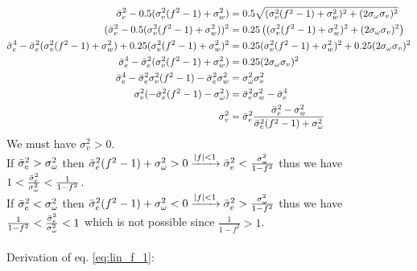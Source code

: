 \documentclass[oneside,12pt]{article}
\newcommand{\abs}[1]{\left| #1\right| }                   %
\begin{document}
\begin{equation*}
    \begin{split}
        \Bar{\sigma}_e^2 - 0.5(\sigma_v^2(f^2-1) + \sigma_w^2) &= 0.5\sqrt{(\sigma_v^2(f^2-1) + \sigma_w^2)^2 + (2\sigma_\omega\sigma_v)^2}\\
        (\Bar{\sigma}_e^2 - 0.5(\sigma_v^2(f^2-1) + \sigma_w^2))^2 &= 0.25\left((\sigma_v^2(f^2-1) + \sigma_w^2)^2 + (2\sigma_\omega\sigma_v)^2\right)\\
        \Bar{\sigma}_e^4 - \Bar{\sigma}_e^2(\sigma_v^2(f^2-1) + \sigma_w^2) + 0.25(\sigma_v^2(f^2-1) + \sigma_w^2)^2 &= 0.25(\sigma_v^2(f^2-1) + \sigma_w^2)^2 + 0.25(2\sigma_\omega\sigma_v)^2\\
        \Bar{\sigma}_e^4 - \Bar{\sigma}_e^2(\sigma_v^2(f^2-1) + \sigma_w^2) &= 0.25(2\sigma_\omega\sigma_v)^2\\
        \Bar{\sigma}_e^4 - \Bar{\sigma}_e^2\sigma_v^2(f^2-1) - \Bar{\sigma}_e^2\sigma_w^2 &= \sigma_\omega^2\sigma_v^2\\
        \sigma_v^2(- \Bar{\sigma}_e^2(f^2-1) - \sigma_\omega^2) &= \Bar{\sigma}_e^2\sigma_w^2 - \Bar{\sigma}_e^4\\
        \sigma_v^2 &= \Bar{\sigma}_e^2 \frac{\Bar{\sigma}_e^2 - \sigma_w^2}{\Bar{\sigma}_e^2(f^2-1) + \sigma_\omega^2}
    \end{split}
\end{equation*}
%
We must have $\sigma_v^2 > 0$.
%
\\If $\Bar{\sigma}_e^2 > \sigma_\omega^2$ then $\Bar{\sigma}_e^2(f^2-1) + \sigma_\omega^2 > 0 \xrightarrow{\abs{f} < 1} \Bar{\sigma}_e^2 < \frac{\sigma_\omega^2}{1-f^2}$ thus we have $1 < \frac{\Bar{\sigma}_e^2}{\sigma_\omega^2} < \frac{1}{1-f^2}$. 
%
\\If $\Bar{\sigma}_e^2 < \sigma_\omega^2$ then $\Bar{\sigma}_e^2(f^2-1) + \sigma_\omega^2 < 0 \xrightarrow{\abs{f} < 1} \Bar{\sigma}_e^2 > \frac{\sigma_\omega^2}{1-f^2}$ thus we have $\frac{1}{1-f^2} < \frac{\Bar{\sigma}_e^2}{\sigma_\omega^2} < 1$ which is not possible since $\frac{1}{1-f^2} > 1$.\\\\
%
Derivation of eq. \ref{eq:lin_f_1}:
%
\end{document}

